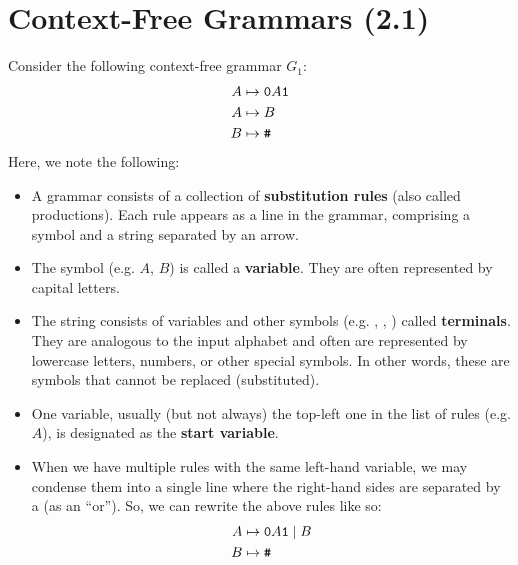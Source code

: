 \documentclass[letterpaper]{article}
\begin{document}
\newpage 
\section{Context-Free Grammars (2.1)}
Consider the following context-free grammar $G_1$:
\begin{equation*}
    \begin{aligned}
        A &\mapsto \texttt{0}A\texttt{1} \\ 
        A &\mapsto B \\ 
        B &\mapsto \texttt{\#}
    \end{aligned}
\end{equation*}
Here, we note the following:  
\begin{itemize}
    \item A grammar consists of a collection of \textbf{substitution rules} (also called productions). Each rule appears as a line in the grammar, comprising a symbol and a string separated by an arrow. 
    \item The symbol (e.g. $A$, $B$) is called a \textbf{variable}. They are often represented by capital letters.  
    \item The string consists of variables and other symbols (e.g. , , \code{\#}) called \textbf{terminals}. They are analogous to the input alphabet and often are represented by lowercase letters, numbers, or other special symbols. In other words, these are symbols that cannot be replaced (substituted). 
    \item One variable, usually (but not always) the top-left one in the list of rules (e.g. $A$), is designated as the \textbf{start variable}.
    \item When we have multiple rules with the same left-hand variable, we may condense them into a single line where the right-hand sides are separated by a \code{|} (as an ``or''). So, we can rewrite the above rules like so: 
    \begin{equation*}
        \begin{aligned}
            A &\mapsto \texttt{0}A\texttt{1} \mid B \\
            B &\mapsto \texttt{\#}
        \end{aligned}
    \end{equation*}
\end{itemize}
\end{document}
